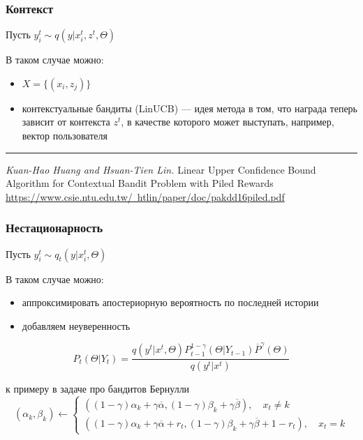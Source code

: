\documentclass[fullscreen=true, bookmarks=true, hyperref={pdfencoding=unicode}]{beamer}
\begin{document}
\begin{frame}
  \frametitle{Контекст}

  Пусть $y^t_i \sim q(y|x^t_i, z^t, \Theta)$

  В таком случае можно:
  \begin{itemize}
    \item $X = \{(x_i, z_j)\}$
    \item контекстуальные бандиты (LinUCB) — идея метода в том, что награда теперь зависит от контекста $z^t$, в качестве которого может выступать, например, вектор пользователя
  \end{itemize}

  \vspace{1cm}
  \noindent\rule{8cm}{0.4pt}

  {\small
  {\it Kuan-Hao Huang and Hsuan-Tien Lin.} Linear Upper Confidence Bound Algorithm for Contextual Bandit Problem with Piled Rewards
  \href{https://www.csie.ntu.edu.tw/~htlin/paper/doc/pakdd16piled.pdf}{https://www.csie.ntu.edu.tw/~htlin/paper/doc/pakdd16piled.pdf}}
\end{frame}


\begin{frame}
  \frametitle{Нестационарность}

  Пусть $y^t_i \sim q_t(y|x^t_i, \Theta)$

  В таком случае можно:
  \begin{itemize}
    \item аппроксимировать апостериорную вероятность по последней истории
    \item добавляем неуверенность
  \end{itemize}
  $$P_t(\Theta|Y_t) = \frac{q(y^t|x^t, \Theta) P^{1-\gamma}_{t-1}(\Theta|Y_{t-1}) \overline{P}^\gamma(\Theta)}{q(y^t|x^t)}$$

  к примеру в задаче про бандитов Бернулли
  $$(\alpha_k, \beta_k) \leftarrow
  \begin{cases}
  ((1-\gamma)\alpha_k + \gamma\overline{\alpha}, (1-\gamma)\beta_k + \gamma\overline{\beta}), \quad x_t \neq k \\
  ((1-\gamma)\alpha_k + \gamma\overline{\alpha} + r_t, (1-\gamma)\beta_k + \gamma\overline{\beta} + 1 - r_t), \quad x_t = k
  \end{cases}$$
\end{frame}
\end{document}
